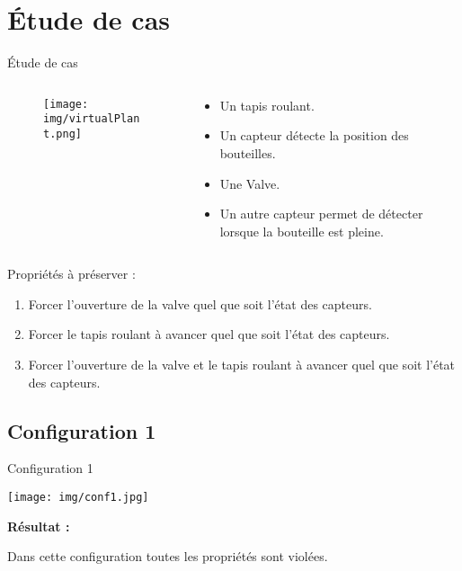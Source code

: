 \documentclass[11pt]{beamer}
\begin{document}
\section{Étude de cas}
\begin{frame}{Étude de cas}
\begin{columns}
	   \begin{column}{0.5\textwidth}
		\vspace{-30pt}
			\begin{figure}[H]
				\texttt{[image: img/virtualPlant.png]} 
			\end{figure}
		\end{column}
		\begin{column}{0.5\textwidth}
			\vspace{-30pt}			
			\begin{itemize}
				\item Un tapis roulant. 
				\item Un capteur détecte la position des bouteilles.
				\item Une Valve.
				\item Un autre capteur permet de détecter lorsque la bouteille est pleine.
			\end{itemize}
		\end{column}
		
	\end{columns}
\vspace{20pt}
\pause
Propriétés à préserver  :
\begin{enumerate}
\item Forcer l'ouverture de la valve quel que soit l'état des capteurs.	
\item Forcer le tapis roulant à avancer quel que soit l'état des capteurs.
\item Forcer l'ouverture de la valve et le tapis roulant à avancer quel que soit l'état des capteurs.
\end{enumerate}
\end{frame}
\subsection{Configuration 1}
\begin{frame}{Configuration 1}
\begin{center}
\texttt{[image: img/conf1.jpg]} 
\end{center}
\medskip
\pause
\textbf{Résultat :}\newline

Dans cette configuration toutes les propriétés sont violées.
\medskip
\end{frame}
\end{document}
